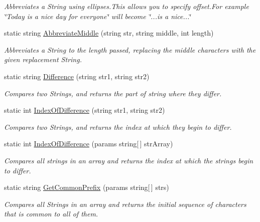 \begin{DoxyCompactItemize}
\begin{DoxyCompactList}\small\item\em Abbreviates a String using ellipses.\+This allows you to specify offset.\+For example \char`\"{}\+Today is a nice day for everyone\char`\"{} will become \char`\"{}...\+is a nice...\char`\"{} \end{DoxyCompactList}\item 
static string \hyperlink{class_ultimate_1_1_utilities_1_1_string_utils_ac553a97214ef60db217310c0663222b2}{Abbreviate\+Middle} (string str, string middle, int length)
\begin{DoxyCompactList}\small\item\em Abbreviates a String to the length passed, replacing the middle characters with the given replacement String. \end{DoxyCompactList}\item 
static string \hyperlink{class_ultimate_1_1_utilities_1_1_string_utils_a2223f8a02815e1fe60d42cb53dece86e}{Difference} (string str1, string str2)
\begin{DoxyCompactList}\small\item\em Compares two Strings, and returns the part of string where they differ. \end{DoxyCompactList}\item 
static int \hyperlink{class_ultimate_1_1_utilities_1_1_string_utils_a991ddd501f079758a091137cfa8dd59d}{Index\+Of\+Difference} (string str1, string str2)
\begin{DoxyCompactList}\small\item\em Compares two Strings, and returns the index at which they begin to differ. \end{DoxyCompactList}\item 
static int \hyperlink{class_ultimate_1_1_utilities_1_1_string_utils_a6c946aa1c848758ec211f8fdf40d1d2e}{Index\+Of\+Difference} (params string\mbox{[}$\,$\mbox{]} str\+Array)
\begin{DoxyCompactList}\small\item\em Compares all strings in an array and returns the index at which the strings begin to differ. \end{DoxyCompactList}\item 
static string \hyperlink{class_ultimate_1_1_utilities_1_1_string_utils_a94734ea374b3fc6764df107fe7c2f48e}{Get\+Common\+Prefix} (params string\mbox{[}$\,$\mbox{]} strs)
\begin{DoxyCompactList}\small\item\em Compares all Strings in an array and returns the initial sequence of characters that is common to all of them. \end{DoxyCompactList}\item 

\end{DoxyCompactItemize}
